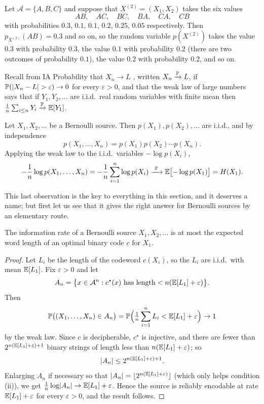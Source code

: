 \documentclass[a4paper]{scrartcl}
\DeclarePairedDelimiter{\floor}{\lfloor}{\rfloor}
\newcommand{\Ac}{\mathcal{A}}
\begin{document}
\begin{example}
	Let $\Ac = \{A,B,C\}$ and suppose that $X^{(2)} = (X_1,X_2)$ takes the six values
	$$AB,\quad AC,\quad BC,\quad BA,\quad CA,\quad CB$$
	with probabilities $0.3$, $0.1$, $0.1$, $0.2$, $0.25$, $0.05$ respectively. Then $p_{X^{(2)}}(AB) = 0.3$ and so on, so the random variable $p(X^{(2)})$ takes the value $0.3$ with probability $0.3$, the value $0.1$ with probability $0.2$ (there are two outcomes of probability $0.1$), the value $0.2$ with probability $0.2$, and so on.
\end{example}

Recall from IA Probability that $X_n \to L$ , written $X_n \xrightarrow{\mathbb{P}} L$, if $\mathbb{P}(\lvert X_n - L\rvert > \varepsilon) \to 0$ for every $\varepsilon > 0$, and that the weak law of large numbers says that if $Y_1, Y_2, \dots$ are i.i.d.\ real random variables with finite mean then $\frac1n \sum_{i \le n} Y_i \xrightarrow{\mathbb{P}} \mathbb{E}[Y_1]$.

\begin{example}\label{ex:bernoulliaep}
	Let $X_1, X_2, \dots$ be a Bernoulli source. Then $p(X_1), p(X_2), \dots$ are i.i.d., and by independence
	$$p(X_1, \dots, X_n) = p(X_1)p(X_2)\cdots p(X_n).$$
	Applying the weak law to the i.i.d.\ variables $-\log p(X_i)$,
	$$-\frac1n \log p(X_1,\dots,X_n) = -\frac1n \sum_{i=1}^n \log p(X_i) \xrightarrow{\ \mathbb{P}\ } \mathbb{E}\bigl[-\log p(X_1)\bigr] = H(X_1).$$
\end{example}

This last observation is the key to everything in this section, and it deserves a name; but first let us see that it gives the right answer for Bernoulli sources by an elementary route.

\begin{lemma}\label{lem:ratebound}
	The information rate of a Bernoulli source $X_1, X_2, \dots$ is at most the expected word length of an optimal binary code $c$ for $X_1$.
\end{lemma}

\begin{proof}
	Let $L_i$ be the length of the codeword $c(X_i)$, so the $L_i$ are i.i.d.\ with mean $\mathbb{E}[L_1]$. Fix $\varepsilon>0$ and let
	$$A_n = \bigl\{x \in \Ac^n : c^\star(x) \text{ has length} < n(\EE[L_1]+\varepsilon)\bigr\}.$$
	Then
	$$\mathbb{P}\bigl((X_1,\dots,X_n) \in A_n\bigr) = \mathbb{P}\Bigl(\tfrac1n\sum_{i=1}^n L_i < \mathbb{E}[L_1]+\varepsilon\Bigr) \to 1$$
	by the weak law. Since $c$ is decipherable, $c^\star$ is injective, and there are fewer than $2^{n(\mathbb{E}[L_1]+\varepsilon)+1}$ binary strings of length less than $n(\mathbb{E}[L_1]+\varepsilon)$; so
	$$\lvert A_n\rvert \le 2^{n(\mathbb{E}[L_1]+\varepsilon)+1}.$$
	Enlarging $A_n$ if necessary so that $\abs{A_n} = \floor{2^{n(\EE[L_1]+\varepsilon)}}$ (which only helps condition (ii)), we get $\frac1n\log\lvert A_n\rvert\to \mathbb{E}[L_1]+\varepsilon$. Hence the source is reliably encodable at rate $\mathbb{E}[L_1]+\varepsilon$ for every $\varepsilon>0$, and the result follows.
\end{proof}
\end{document}
